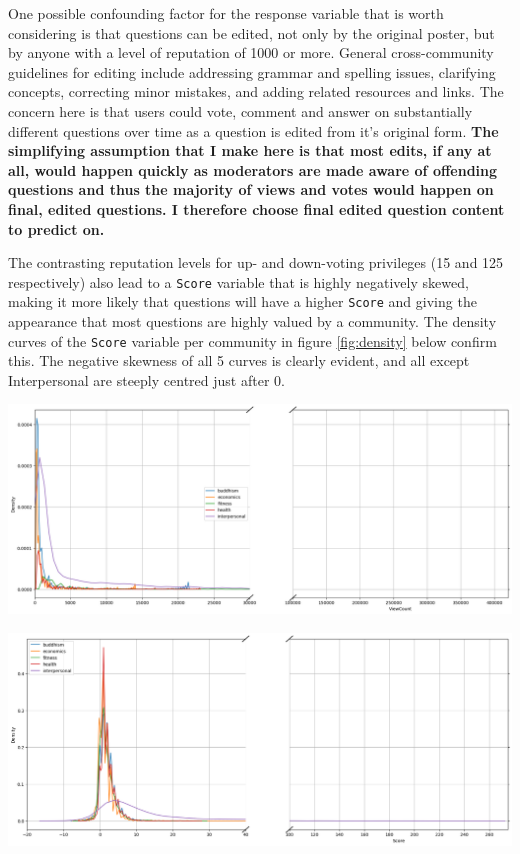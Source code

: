 \documentclass[11pt,preprint, authoryear]{article}
\let\origfigure\figure
\let\endorigfigure\endfigure
\renewenvironment{figure}[1][2] {
    \expandafter\origfigure\expandafter[H]
} {
    \endorigfigure
}
\numberwithin{equation}{section}
\begin{document}
One possible confounding factor for the response variable that is worth
considering is that questions can be edited, not only by the original
poster, but by anyone with a level of reputation of 1000 or more.
General cross-community guidelines for editing include addressing
grammar and spelling issues, clarifying concepts, correcting minor
mistakes, and adding related resources and links. The concern here is
that users could vote, comment and answer on substantially different
questions over time as a question is edited from it's original form.
\textbf{The simplifying assumption that I make here is that most edits,
if any at all, would happen quickly as moderators are made aware of
offending questions and thus the majority of views and votes would
happen on final, edited questions. I therefore choose final edited
question content to predict on.}

The contrasting reputation levels for up- and down-voting privileges (15
and 125 respectively) also lead to a \texttt{Score} variable that is
highly negatively skewed, making it more likely that questions will have
a higher \texttt{Score} and giving the appearance that most questions
are highly valued by a community. The density curves of the
\texttt{Score} variable per community in figure \ref{fig:density} below
confirm this. The negative skewness of all 5 curves is clearly evident,
and all except Interpersonal are steeply centred just after 0.

\footnotesize

\begin{figure}
\caption{\textbf{Density Plots}}
\label{fig:density}

\begin{center}\includegraphics[width=0.8\linewidth]{../../01-python-code/00-workspace/01-graphs/views-density-plot} \end{center}



\begin{center}\includegraphics[width=0.8\linewidth]{../../01-python-code/00-workspace/01-graphs/score-density-plot} \end{center}
\end{figure}
\end{document}
